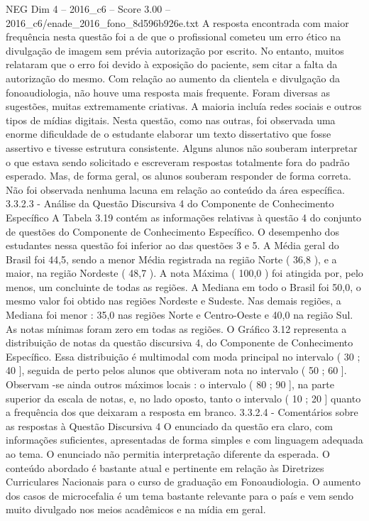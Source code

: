 \begin{textsample}{NEG Dim 4 – 2016\_c6 – Score 3.00 – 2016\_c6/enade\_2016\_fono\_8d596b926e.txt}
A resposta encontrada com maior frequência nesta questão foi a de que o profissional cometeu um erro ético na divulgação de imagem sem prévia autorização por escrito.
No entanto, muitos relataram que o erro foi devido à exposição do paciente, sem citar a falta da autorização do mesmo.
Com relação ao aumento da clientela e divulgação da fonoaudiologia, não houve uma resposta mais frequente.
Foram diversas as sugestões, muitas extremamente criativas.
A maioria incluía redes sociais e outros tipos de mídias digitais.
Nesta questão, como nas outras, foi observada uma enorme dificuldade de o estudante elaborar um texto dissertativo que fosse assertivo e tivesse estrutura consistente.
Alguns alunos não souberam interpretar o que estava sendo solicitado e escreveram respostas totalmente fora do padrão esperado.
Mas, de forma geral, os alunos souberam responder de forma correta.
Não foi observada nenhuma lacuna em relação ao conteúdo da área específica. 3.3.2.3 - Análise da Questão Discursiva 4 do Componente de Conhecimento Específico A Tabela 3.19 contém as informações relativas à questão 4 do conjunto de questões do Componente de Conhecimento Específico.
O desempenho dos estudantes nessa questão foi inferior ao das questões 3 e 5.
A Média geral do Brasil foi 44,5, sendo a menor Média registrada na região Norte ( 36,8 ), e a maior, na região Nordeste ( 48,7 ).
A nota Máxima ( 100,0 ) foi atingida por, pelo menos, um concluinte de todas as regiões.
A Mediana em todo o Brasil foi 50,0, o mesmo valor foi obtido nas regiões Nordeste e Sudeste.
Nas demais regiões, a Mediana foi menor : 35,0 nas regiões Norte e Centro-Oeste e 40,0 na região Sul.
As notas mínimas foram zero em todas as regiões.
O Gráfico 3.12 representa a distribuição de notas da questão discursiva 4, do Componente de Conhecimento Específico.
Essa distribuição é multimodal com moda principal no intervalo ( 30 ; 40 ], seguida de perto pelos alunos que obtiveram nota no intervalo ( 50 ; 60 ].
Observam -se ainda outros máximos locais : o intervalo ( 80 ; 90 ], na parte superior da escala de notas, e, no lado oposto, tanto o intervalo ( 10 ; 20 ] quanto a frequência dos que deixaram a resposta em branco. 3.3.2.4 - Comentários sobre as respostas à Questão Discursiva 4 O enunciado da questão era claro, com informações suficientes, apresentadas de forma simples e com linguagem adequada ao tema.
O enunciado não permitia interpretação diferente da esperada.
O conteúdo abordado é bastante atual e pertinente em relação às Diretrizes Curriculares Nacionais para o curso de graduação em Fonoaudiologia.
O aumento dos casos de microcefalia é um tema bastante relevante para o país e vem sendo muito divulgado nos meios acadêmicos e na mídia em geral.

\end{textsample}
